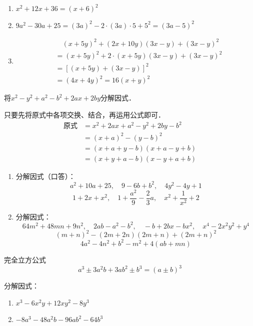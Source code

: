 \begin{solution}
    \begin{enumerate}
        \item $x^2+12x+36=(x+6)^2$
        \item $9a^2-30a+25=(3a)^2-2\cdot (3a)\cdot 5+5^2=(3a-5)^2$
        \item \[\begin{split}
           &\quad  (x+5y)^2+(2x+10y)(3x-y)+(3x-y)^2\\
           &=(x+5y)^2+2\cdot (x+5y)(3x-y) +(3x-y) ^2\\
           &=[(x+5y) +(3x-y) ]^2\\
           &=(4x+4y)^2=16(x+y)^2          
        \end{split}\]
    \end{enumerate}
\end{solution}


\begin{example}
将$x^2-y^2+a^2-b^2+2ax+2by$分解因式．
\end{example}


\begin{solution}
    只要先将原式中各项交换、结合，再运用公式即可．
\[\begin{split}
  \text{原式}&=x^2+2ax+a^2-y^2+2by-b^2\\
  &=(x+a)^2-(y-b)^2\\
  &=(x+a+y-b)(x+a-y+b)\\
  &=(x+y+a-b)(x-y+a+b)  
\end{split}\]
\end{solution}

\begin{ex}
\begin{enumerate}
    \item 分解因式（口答）：
    \[a^2+10a+25,\quad 9-6b+b^2,\quad 4y^2-4y+1\]
    \[1+2x+x^2,\quad 1+\frac{a^2}{9}-\frac{2}{3}a,\quad x^2+\frac{1}{x^2}+2\] 
    \item 分解因式：
     \[64m^2+48mn+9n^2,\quad 2ab-a^2-b^2,\quad -b+2bx-bx^2,\quad x^4-2x^2y^2+y^4\] 
     \[(m+n)^2-(2m+2n)(2m+n)+(2m+n)^2\]\[ 4a^2-4n^2+b^2-m^2+4(ab+mn) \]
\end{enumerate}
\end{ex}

\begin{blk}{完全立方公式}
\[a^3\pm 3a^2b+3ab^2\pm b^3=(a\pm b)^3\]
\end{blk}

\begin{example}
    分解因式：
    \begin{enumerate}
        \item $x^3-6x^2y+12xy^2-8y^3$
        \item $-8a^3-48a^2b-96ab^2-64b^3$
    \end{enumerate}
\end{example}

